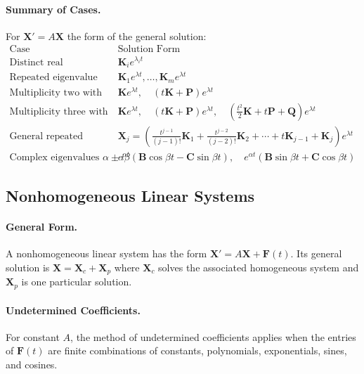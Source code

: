\documentclass[oneside]{book}
\begin{document}
\paragraph{Summary of Cases.}
For $\mathbf{X}'=A\mathbf{X}$ the form of the general solution:
\[
\begin{array}{c|c}
\text{Case} & \text{Solution Form}\\
\hline
\text{Distinct real eigenvalues}
&
\mathbf{K}_i e^{\lambda_i t}
\\[6pt]
\text{Repeated eigenvalue with enough eigenvectors}
&
\mathbf{K}_1e^{\lambda t},\ldots,\mathbf{K}_me^{\lambda t}
\\[6pt]
\text{Multiplicity two with one eigenvector}
&
\mathbf{K}e^{\lambda t},\quad
(t\mathbf{K}+\mathbf{P})e^{\lambda t}
\\[6pt]
\text{Multiplicity three with one eigenvector}
&
\mathbf{K}e^{\lambda t},\quad
(t\mathbf{K}+\mathbf{P})e^{\lambda t},\quad
\left(\frac{t^2}{2}\mathbf{K}+t\mathbf{P}+\mathbf{Q}\right)e^{\lambda t}
\\[6pt]
\text{General repeated eigenvalue with one eigenvector}
&
\mathbf{X}_j
=
\left(
    \frac{t^{j-1}}{(j-1)!}\mathbf{K}_1
    +
    \frac{t^{j-2}}{(j-2)!}\mathbf{K}_2
    +
    \cdots
    +
    t\mathbf{K}_{j-1}
    +
    \mathbf{K}_j
\right)e^{\lambda t}
\\[10pt]
\text{Complex eigenvalues } \alpha\pm i\beta
&
e^{\alpha t}(\mathbf{B}\cos\beta t-\mathbf{C}\sin\beta t),\quad
e^{\alpha t}(\mathbf{B}\sin\beta t+\mathbf{C}\cos\beta t)
\end{array}
\]



\subsection{Nonhomogeneous Linear Systems}

\paragraph{General Form.}
A nonhomogeneous linear system has the form $\mathbf{X}'=A\mathbf{X}+\mathbf{F}(t)$. Its general solution is $\mathbf{X}=\mathbf{X}_c+\mathbf{X}_p$ where $\mathbf{X}_c$ solves the associated homogeneous system and
$\mathbf{X}_p$ is one particular solution.

\paragraph{Undetermined Coefficients.}
For constant $A$, the method of undetermined coefficients applies when the entries
of $\mathbf{F}(t)$ are finite combinations of constants, polynomials,
exponentials, sines, and cosines.
\end{document}
